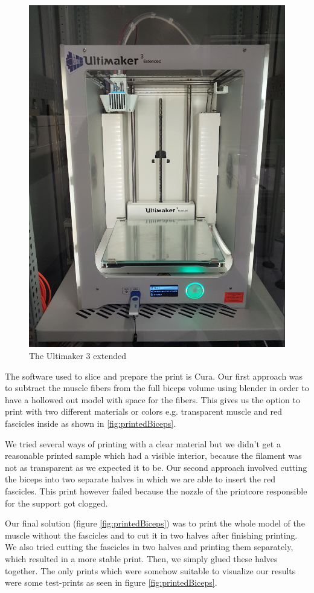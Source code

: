 \documentclass[preprint,journal]{vgtc}       %
\begin{document}
\begin{figure}
	\centering
	\includegraphics[width=.75\linewidth]{ultimaker-pinter2.png}
	\caption{The Ultimaker 3 extended}
	\label{fig:3dPrinter}
\end{figure}

The software used to slice and prepare the print is Cura. 
Our first approach was to subtract the muscle fibers from the full biceps volume using blender in order to have a hollowed out model with space for the fibers. 
This gives us the option to print with two different materials or colors e.g. transparent muscle and red fascicles inside as shown in \ref{fig:printedBiceps}. 

We tried several ways of printing with a clear material but we didn't get a reasonable printed sample which had a visible interior, because the filament was not as transparent as we expected it to be.
Our second approach involved cutting the biceps into two separate halves in which we are able to insert the red fascicles. 
This print however failed because the nozzle of the printcore responsible for the support got clogged. 

Our final solution (figure \ref{fig:printedBiceps}) was to print the whole model of the muscle without the fascicles and to cut it in two halves after finishing printing.  
We also tried cutting the fascicles in two halves and printing them separately, which resulted in a more stable print. 
Then, we simply glued these halves together.
The only prints which were somehow suitable to visualize our results were some test-prints as seen in figure \ref{fig:printedBiceps}.
\end{document}
